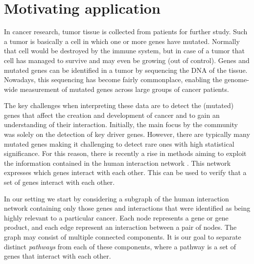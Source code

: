 \documentclass[conference]{IEEEtran}
\begin{document}
\section{Motivating application}
\label{sec:motivation}
In cancer research, tumor tissue is collected from patients for further study. Such a tumor is basically a cell in which one or more genes have mutated. Normally that cell would be destroyed by the immune system, but in case of a tumor that cell has managed to survive and may even be growing (out of control).
Genes and mutated genes can be identified in a tumor by sequencing the DNA of the tissue. Nowadays, this sequencing has become fairly commonplace, enabling the genome-wide measurement of mutated genes across large groups of cancer patients.

The key challenges when interpreting these data are to detect the (mutated) genes that affect the creation and development of cancer and to gain an understanding of their interaction. Initially, the main focus by the community was solely on the detection of key driver genes. However, there are typically many mutated genes making it challenging to detect rare ones with high statistical significance. For this reason, there is recently a rise in methods aiming to exploit the information contained in the human interaction network \cite{leiserson2015pan,pulido2015ssa}. This network expresses which genes interact with each other. This can be used to verify that a set of genes interact with each other.

In our setting we start by considering a subgraph of the human interaction network containing only those genes and interactions that were identified as being highly relevant to a particular cancer. Each node represents a gene or gene product, and each edge represent an interaction between a pair of nodes. The graph may consist of multiple connected components. It is our goal to separate distinct \textit{pathways} from each of these components, where a pathway is a set of genes that interact with each other.
\end{document}
